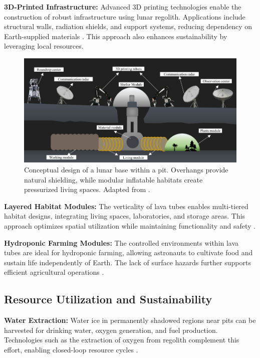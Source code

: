 \textbf{3D-Printed Infrastructure:}  
Advanced 3D printing technologies enable the construction of robust infrastructure using lunar regolith. Applications include structural walls, radiation shields, and support systems, reducing dependency on Earth-supplied materials \cite{jsanders-isru}. This approach also enhances sustainability by leveraging local resources.

\begin{figure}[H]
    \centering
    \includegraphics[width=0.8\linewidth]{simple-base-schema.png}
    \caption{Conceptual design of a lunar base within a pit. Overhangs provide natural shielding, while modular inflatable habitats create pressurized living spaces. Adapted from \cite{bases-feng}.}
    \label{fig:lunar-habitat}
\end{figure}

\textbf{Layered Habitat Modules:}  
The verticality of lava tubes enables multi-tiered habitat designs, integrating living spaces, laboratories, and storage areas. This approach optimizes spatial utilization while maintaining functionality and safety \cite{sublunear-lava}.

\textbf{Hydroponic Farming Modules:}  
The controlled environments within lava tubes are ideal for hydroponic farming, allowing astronauts to cultivate food and sustain life independently of Earth. The lack of surface hazards further supports efficient agricultural operations \cite{bases-feng}.

\subsection{Resource Utilization and Sustainability}

\textbf{Water Extraction:}  
Water ice in permanently shadowed regions near pits can be harvested for drinking water, oxygen generation, and fuel production. Technologies such as the extraction of oxygen from regolith complement this effort, enabling closed-loop resource cycles \cite{jsanders-isru}.

